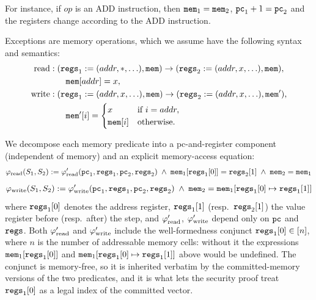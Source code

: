 For instance, if $op$ is an ADD instruction, then $\mathtt{mem}_1=\mathtt{mem}_2$, $\mathtt{pc}_1+1=\mathtt{pc}_2$ and the registers change according to the ADD instruction.


 Exceptions are memory operations,
which we assume have the following syntax and semantics:
\begin{align}
\mathrm{read}:\;&(\mathtt{regs}_1:=(addr,*,\ldots),\mathtt{mem})\rightarrow (\mathtt{regs}_2:=(addr,x,\ldots),\mathtt{mem}),\notag\\
&\quad \mathtt{mem}[addr]=x,\label{eq:mem-op-read}\\
\mathrm{write}:\;&(\mathtt{regs}_1:=(addr,x,\ldots),\mathtt{mem})\rightarrow (\mathtt{regs}_2:=(addr,x,\ldots),\mathtt{mem}'),\notag\\
&\quad \mathtt{mem}'[i]=\begin{cases}
x & \text{if }i=addr,\\
\mathtt{mem}[i] & \text{otherwise}.
\end{cases}\label{eq:mem-op-write}
\end{align}

We decompose each memory predicate into a pc-and-register component
(independent of memory) and an explicit memory-access equation:
\begin{multline}
  \varphi_{\mathrm{read}}(S_1,S_2) :=
    \varphi'_{\mathrm{read}}(\mathtt{pc}_1,\mathtt{regs}_1,\mathtt{pc}_2,\mathtt{regs}_2)
    \;\wedge\; \mathtt{mem}_1[\mathtt{regs}_1[0]] = \mathtt{regs}_2[1]
    \;\wedge\; \mathtt{mem}_2 = \mathtt{mem}_1
  \label{eq:phi-read-decomp}
\end{multline}
\begin{multline}
  \varphi_{\mathrm{write}}(S_1,S_2) :=
    \varphi'_{\mathrm{write}}(\mathtt{pc}_1,\mathtt{regs}_1,\mathtt{pc}_2,\mathtt{regs}_2)
    \;\wedge\; \mathtt{mem}_2 = \mathtt{mem}_1[\mathtt{regs}_1[0]\mapsto\mathtt{regs}_1[1]]
  \label{eq:phi-write-decomp}
\end{multline}
where $\mathtt{regs}_1[0]$ denotes the address register, $\mathtt{regs}_1[1]$ (resp.\ $\mathtt{regs}_2[1]$)
the value register before (resp.\ after) the step, and
$\varphi'_{\mathrm{read}}$, $\varphi'_{\mathrm{write}}$ depend only on $\mathtt{pc}$ and $\mathtt{regs}$.
Both $\varphi'_{\mathrm{read}}$ and $\varphi'_{\mathrm{write}}$ include the well-formedness
conjunct $\mathtt{regs}_1[0]\in[n]$, where $n$ is the number of addressable memory
cells: without it the expressions $\mathtt{mem}_1[\mathtt{regs}_1[0]]$ and
$\mathtt{mem}_1[\mathtt{regs}_1[0]\mapsto\mathtt{regs}_1[1]]$ above would be undefined.  The conjunct is
memory-free, so it is inherited verbatim by the committed-memory versions of the
two predicates, and it is what lets the security proof treat $\mathtt{regs}_1[0]$ as a
legal index of the committed vector.

